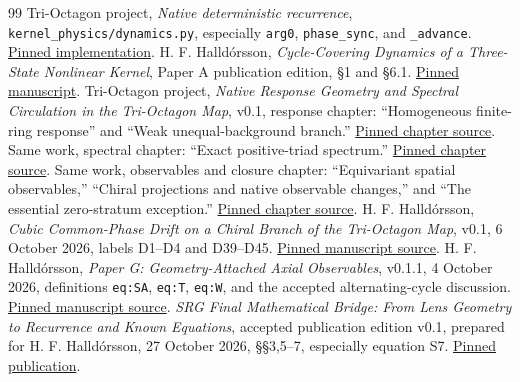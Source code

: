\begin{thebibliography}{99}\small
{} Tri-Octagon project, \emph{Native deterministic recurrence}, \texttt{kernel\_physics/dynamics.py}, especially \texttt{arg0}, \texttt{phase\_sync}, and \texttt{\_advance}. \href{https://github.com/pzychozen/trioctagon-physics/blob/ad8a6e88b4a78d8b1955b34d5ff80b6c21713ade/kernel_physics/dynamics.py}{Pinned implementation}.
 H. F. Halld\'orsson, \emph{Cycle-Covering Dynamics of a Three-State Nonlinear Kernel}, Paper A publication edition, \S1 and \S6.1. \href{https://github.com/pzychozen/trioctagon-physics/blob/ad8a6e88b4a78d8b1955b34d5ff80b6c21713ade/papers/PAPER_A/publication/paper_A_publication.md}{Pinned manuscript}.
 Tri-Octagon project, \emph{Native Response Geometry and Spectral Circulation in the Tri-Octagon Map}, v0.1, response chapter: ``Homogeneous finite-ring response'' and ``Weak unequal-background branch.'' \href{https://github.com/pzychozen/trioctagon-physics/blob/ad8a6e88b4a78d8b1955b34d5ff80b6c21713ade/papers/NATIVE_RESPONSE_GEOMETRY/manuscript/response.tex}{Pinned chapter source}.
 Same work, spectral chapter: ``Exact positive-triad spectrum.'' \href{https://github.com/pzychozen/trioctagon-physics/blob/ad8a6e88b4a78d8b1955b34d5ff80b6c21713ade/papers/NATIVE_RESPONSE_GEOMETRY/manuscript/spectral.tex}{Pinned chapter source}.
 Same work, observables and closure chapter: ``Equivariant spatial observables,'' ``Chiral projections and native observable changes,'' and ``The essential zero-stratum exception.'' \href{https://github.com/pzychozen/trioctagon-physics/blob/ad8a6e88b4a78d8b1955b34d5ff80b6c21713ade/papers/NATIVE_RESPONSE_GEOMETRY/manuscript/observables_closure.tex}{Pinned chapter source}.
 H. F. Halld\'orsson, \emph{Cubic Common-Phase Drift on a Chiral Branch of the Tri-Octagon Map}, v0.1, 6 October 2026, labels D1--D4 and D39--D45. \href{https://github.com/pzychozen/trioctagon-physics/blob/ad8a6e88b4a78d8b1955b34d5ff80b6c21713ade/papers/MEASUREMENT_AND_CHIRAL_DRIFT/v0.1/drift/manuscript.tex}{Pinned manuscript source}.
 H. F. Halld\'orsson, \emph{Paper G: Geometry-Attached Axial Observables}, v0.1.1, 4 October 2026, definitions \texttt{eq:SA}, \texttt{eq:T}, \texttt{eq:W}, and the accepted alternating-cycle discussion. \href{https://github.com/pzychozen/trioctagon-physics/blob/ad8a6e88b4a78d8b1955b34d5ff80b6c21713ade/papers/PAPER_G/v0.1.1/source/paper_g.tex}{Pinned manuscript source}.
 \emph{SRG Final Mathematical Bridge: From Lens Geometry to Recurrence and Known Equations}, accepted publication edition v0.1, prepared for H. F. Halld\'orsson, 27 October 2026, \S\S3,5--7, especially equation S7. \href{https://github.com/pzychozen/trioctagon-physics/blob/ad8a6e88b4a78d8b1955b34d5ff80b6c21713ade/SRG_REDISCOVERY/FINAL_MATHEMATICAL_BRIDGE/publication/v0.1/SRG_FINAL_MATHEMATICAL_BRIDGE_v0.1.md}{Pinned publication}.

\end{thebibliography}
